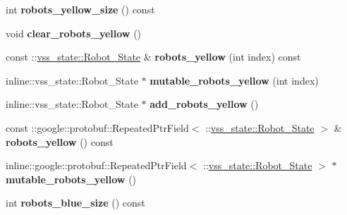 \begin{DoxyCompactItemize}
\item 
int {\bfseries robots\+\_\+yellow\+\_\+size} () const \hypertarget{classvss__state_1_1Global__State_ad9605aa1df1cc1a30adc6a88bd85f34f}{}\label{classvss__state_1_1Global__State_ad9605aa1df1cc1a30adc6a88bd85f34f}

\item 
void {\bfseries clear\+\_\+robots\+\_\+yellow} ()\hypertarget{classvss__state_1_1Global__State_a5519565ece84f3f429aa692217fff1f6}{}\label{classvss__state_1_1Global__State_a5519565ece84f3f429aa692217fff1f6}

\item 
const \+::\hyperlink{classvss__state_1_1Robot__State}{vss\+\_\+state\+::\+Robot\+\_\+\+State} \& {\bfseries robots\+\_\+yellow} (int index) const \hypertarget{classvss__state_1_1Global__State_a311a39a8f7be0721ebb684b9bc286ce2}{}\label{classvss__state_1_1Global__State_a311a39a8f7be0721ebb684b9bc286ce2}

\item 
inline\+::vss\+\_\+state\+::\+Robot\+\_\+\+State $\ast$ {\bfseries mutable\+\_\+robots\+\_\+yellow} (int index)\hypertarget{classvss__state_1_1Global__State_a040f90d8bad2e783b1e91077a7c79234}{}\label{classvss__state_1_1Global__State_a040f90d8bad2e783b1e91077a7c79234}

\item 
inline\+::vss\+\_\+state\+::\+Robot\+\_\+\+State $\ast$ {\bfseries add\+\_\+robots\+\_\+yellow} ()\hypertarget{classvss__state_1_1Global__State_aecf340a8be8a26db65bd29ebafcbf1d6}{}\label{classvss__state_1_1Global__State_aecf340a8be8a26db65bd29ebafcbf1d6}

\item 
const \+::google\+::protobuf\+::\+Repeated\+Ptr\+Field$<$ \+::\hyperlink{classvss__state_1_1Robot__State}{vss\+\_\+state\+::\+Robot\+\_\+\+State} $>$ \& {\bfseries robots\+\_\+yellow} () const \hypertarget{classvss__state_1_1Global__State_ad18fe89214728e2c808c8911575ab90b}{}\label{classvss__state_1_1Global__State_ad18fe89214728e2c808c8911575ab90b}

\item 
inline\+::google\+::protobuf\+::\+Repeated\+Ptr\+Field$<$ \+::\hyperlink{classvss__state_1_1Robot__State}{vss\+\_\+state\+::\+Robot\+\_\+\+State} $>$ $\ast$ {\bfseries mutable\+\_\+robots\+\_\+yellow} ()\hypertarget{classvss__state_1_1Global__State_a533514002331b04a673326f334a3e5ce}{}\label{classvss__state_1_1Global__State_a533514002331b04a673326f334a3e5ce}

\item 
int {\bfseries robots\+\_\+blue\+\_\+size} () const \hypertarget{classvss__state_1_1Global__State_ab19e999740e3aa72946a92322bc7f163}{}\label{classvss__state_1_1Global__State_ab19e999740e3aa72946a92322bc7f163}


\end{DoxyCompactItemize}
